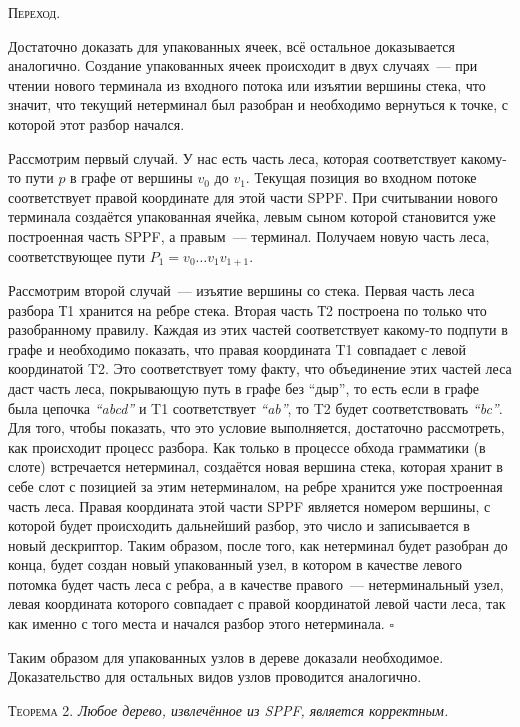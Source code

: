 \textsc{Переход.}

Достаточно доказать для упакованных ячеек, всё остальное доказывается аналогично. Создание упакованных ячеек происходит в двух случаях~--- при чтении нового терминала из входного потока или изъятии вершины стека, что значит, что текущий нетерминал был разобран и необходимо вернуться к точке, с которой этот разбор начался. 

Рассмотрим первый случай. У нас есть часть леса, которая соответствует какому-то пути $p$ в графе от вершины $v_0$ до $v_1$. Текущая позиция во входном потоке соответствует правой координате для этой части SPPF. При считывании нового терминала создаётся упакованная ячейка, левым сыном которой становится уже построенная часть SPPF, а правым~--- терминал. Получаем новую часть леса, соответствующее пути $P_1 = v_0 \dots v_1 v_{1+1}$.

Рассмотрим второй случай~--- изъятие вершины со стека. Первая часть леса разбора Т1 хранится на ребре стека. Вторая часть Т2 построена по только что разобранному правилу. Каждая из этих частей соответствует какому-то подпути в графе и необходимо показать, что правая координата T1 совпадает с левой координатой T2. Это соответствует тому факту, что объединение этих частей леса даст часть леса, покрывающую путь в графе без ``дыр'', то есть если в графе была цепочка {\it ``abcd''} и T1 соответствует {\it ``ab''}, то T2 будет соответствовать {\it ``bc''}. Для того, чтобы показать, что это условие выполняется, достаточно рассмотреть, как происходит процесс разбора. Как только в процессе обхода грамматики (в слоте) встречается нетерминал, создаётся новая вершина стека, которая хранит в себе слот с позицией за этим нетерминалом, на ребре хранится уже построенная часть леса. Правая координата этой части SPPF является номером вершины, с которой будет происходить дальнейший разбор, это число и записывается в новый дескриптор. Таким образом, после того, как нетерминал будет разобран до конца, будет создан новый упакованный узел, в котором в качестве левого потомка будет часть леса с ребра, а в качестве правого~--- нетерминальный узел, левая координата которого совпадает с правой координатой левой части леса, так как именно с того места и начался разбор этого нетерминала. $\square$

Таким образом для упакованных узлов в дереве доказали необходимое. Доказательство для остальных видов узлов проводится аналогично.

\textsc{Теорема 2.} 
\textit{Любое дерево, извлечённое из SPPF, является корректным.}


